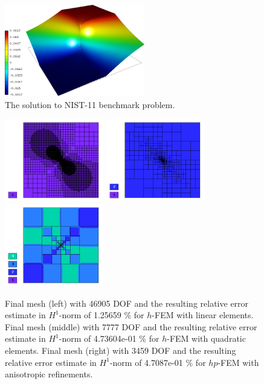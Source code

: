 \documentclass[12pt]{elsarticle}
\begin{document}
\begin{figure}[H]
\centering
\vspace{-5mm}
\includegraphics[height=4cm]{nist/nist-11/solution.png}
\vspace{-2mm}
\caption{The solution to NIST-11 benchmark problem.}
\vspace{-4mm}
\label{fig:sln-nist11}
\end{figure}

\begin{figure}[H]
\centering
\vspace{-5mm}
\includegraphics[height=3.6cm]{nist/nist-11/mesh_h1_aniso.png}
\includegraphics[height=3.6cm]{nist/nist-11/mesh_h2_aniso.png}
\includegraphics[height=3.6cm]{nist/nist-11/mesh_hp_aniso.png}
\vspace{-5mm}
\caption{
Final mesh (left) with 46905 DOF and the resulting
relative error estimate in $H^1$-norm of 1.25659 \% for $h$-FEM with linear elements.
Final mesh (middle) with 7777 DOF and the resulting
relative error estimate in $H^1$-norm of 4.73604e-01 \% for $h$-FEM with quadratic elements.
Final mesh (right) with 3459 DOF and the resulting
relative error estimate in $H^1$-norm of 4.7087e-01 \% for $hp$-FEM with anisotropic refinements.}
\vspace{-5mm}
\label{fig:nist-11-hp-aniso}
\end{figure}
\end{document}
